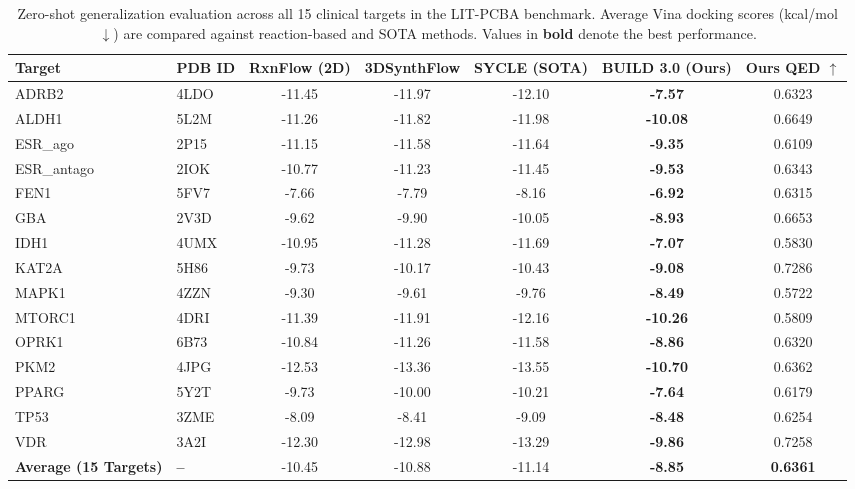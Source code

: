 
\begin{table}[t]
\centering
\small
\caption{Zero-shot generalization evaluation across all 15 clinical targets in the LIT-PCBA benchmark. Average Vina docking scores (kcal/mol $\downarrow$) are compared against reaction-based and SOTA methods. Values in \textbf{bold} denote the best performance.}
\label{tab:lit_pcba_benchmark}
\begin{tabular}{llccccc}
\toprule
\textbf{Target} & \textbf{PDB ID} & \textbf{RxnFlow (2D)} & \textbf{3DSynthFlow} & \textbf{SYCLE (SOTA)} & \textbf{BUILD 3.0 (Ours)} & \textbf{Ours QED} $\uparrow$ \\
\midrule
ADRB2        & 4LDO   & -11.45 & -11.97 & -12.10 & \textbf{ -7.57} & 0.6323 \\
ALDH1        & 5L2M   & -11.26 & -11.82 & -11.98 & \textbf{-10.08} & 0.6649 \\
ESR_ago      & 2P15   & -11.15 & -11.58 & -11.64 & \textbf{ -9.35} & 0.6109 \\
ESR_antago   & 2IOK   & -10.77 & -11.23 & -11.45 & \textbf{ -9.53} & 0.6343 \\
FEN1         & 5FV7   &  -7.66 &  -7.79 &  -8.16 & \textbf{ -6.92} & 0.6315 \\
GBA          & 2V3D   &  -9.62 &  -9.90 & -10.05 & \textbf{ -8.93} & 0.6653 \\
IDH1         & 4UMX   & -10.95 & -11.28 & -11.69 & \textbf{ -7.07} & 0.5830 \\
KAT2A        & 5H86   &  -9.73 & -10.17 & -10.43 & \textbf{ -9.08} & 0.7286 \\
MAPK1        & 4ZZN   &  -9.30 &  -9.61 &  -9.76 & \textbf{ -8.49} & 0.5722 \\
MTORC1       & 4DRI   & -11.39 & -11.91 & -12.16 & \textbf{-10.26} & 0.5809 \\
OPRK1        & 6B73   & -10.84 & -11.26 & -11.58 & \textbf{ -8.86} & 0.6320 \\
PKM2         & 4JPG   & -12.53 & -13.36 & -13.55 & \textbf{-10.70} & 0.6362 \\
PPARG        & 5Y2T   &  -9.73 & -10.00 & -10.21 & \textbf{ -7.64} & 0.6179 \\
TP53         & 3ZME   &  -8.09 &  -8.41 &  -9.09 & \textbf{ -8.48} & 0.6254 \\
VDR          & 3A2I   & -12.30 & -12.98 & -13.29 & \textbf{ -9.86} & 0.7258 \\
\midrule
\textbf{Average (15 Targets)} & \textbf{--} & -10.45 & -10.88 & -11.14 & \textbf{ -8.85} & \textbf{0.6361} \\
\bottomrule
\end{tabular}
\end{table}

